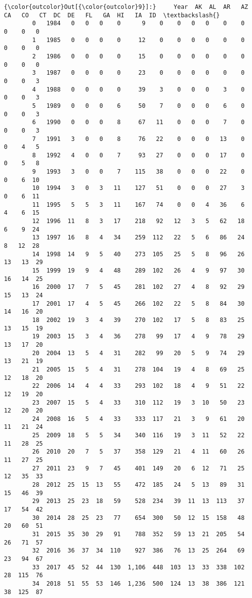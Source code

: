 \documentclass[11pt]{article}
\begin{document}
\begin{Verbatim}[commandchars=\\\{\}]
{\color{outcolor}Out[{\color{outcolor}9}]:}     Year  AK  AL  AR   AZ     CA   CO   CT  DC  DE   FL   GA  HI   IA  ID  \textbackslash{}
        0   1984   0   0   0    0      9    0    0   0   0    0    0   0    0   0   
        1   1985   0   0   0    0     12    0    0   0   0    0    0   0    0   0   
        2   1986   0   0   0    0     15    0    0   0   0    0    0   0    0   0   
        3   1987   0   0   0    0     23    0    0   0   0    0    0   0    0   3   
        4   1988   0   0   0    0     39    3    0   0   0    3    0   0    0   3   
        5   1989   0   0   0    6     50    7    0   0   0    6    0   0    0   3   
        6   1990   0   0   0    8     67   11    0   0   0    7    0   0    0   3   
        7   1991   3   0   0    8     76   22    0   0   0   13    0   0    4   5   
        8   1992   4   0   0    7     93   27    0   0   0   17    0   0    5   8   
        9   1993   3   0   0    7    115   38    0   0   0   22    0   0    6  10   
        10  1994   3   0   3   11    127   51    0   0   0   27    3   0    6  11   
        11  1995   5   5   3   11    167   74    0   0   4   36    6   4    6  15   
        12  1996  11   8   3   17    218   92   12   3   5   62   18   6    9  24   
        13  1997  16   8   4   34    259  112   22   5   6   86   24   8   12  28   
        14  1998  14   9   5   40    273  105   25   5   8   96   26  13   13  29   
        15  1999  19   9   4   48    289  102   26   4   9   97   30  16   14  25   
        16  2000  17   7   5   45    281  102   27   4   8   92   29  15   13  24   
        17  2001  17   4   5   45    266  102   22   5   8   84   30  14   16  20   
        18  2002  19   3   4   39    270  102   17   5   8   83   25  13   15  19   
        19  2003  15   3   4   36    278   99   17   4   9   78   29  13   17  20   
        20  2004  13   5   4   31    282   99   20   5   9   74   29  13   21  19   
        21  2005  15   5   4   31    278  104   19   4   8   69   25  12   18  20   
        22  2006  14   4   4   33    293  102   18   4   9   51   22  12   19  20   
        23  2007  15   5   4   33    310  112   19   3  10   50   23  12   20  20   
        24  2008  16   5   4   33    333  117   21   3   9   61   20  11   21  24   
        25  2009  18   5   5   34    340  116   19   3  11   52   22  11   28  25   
        26  2010  20   7   5   37    358  129   21   4  11   60   26  11   27  25   
        27  2011  23   9   7   45    401  149   20   6  12   71   25  12   35  33   
        28  2012  25  15  13   55    472  185   24   5  13   89   31  15   46  39   
        29  2013  25  23  18   59    528  234   39  11  13  113   37  17   54  42   
        30  2014  28  25  23   77    654  300   50  12  15  158   48  20   60  51   
        31  2015  35  30  29   91    788  352   59  13  21  205   54  26   71  57   
        32  2016  36  37  34  110    927  386   76  13  25  264   69  23   94  67   
        33  2017  45  52  44  130  1,106  448  103  13  33  338  102  28  115  76   
        34  2018  51  55  53  146  1,236  500  124  13  38  386  121  38  125  87   
        

\end{Verbatim}
\end{document}

